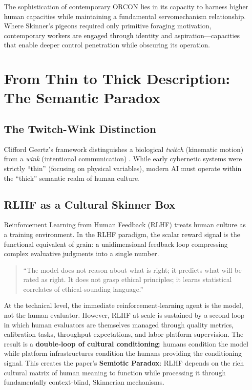 \documentclass[11pt, a4paper]{article}
\begin{document}
The sophistication of contemporary ORCON lies in its capacity to harness higher human capacities while maintaining a fundamental servomechanism relationship. Where Skinner's pigeons required only primitive foraging motivation, contemporary workers are engaged through identity and aspiration—capacities that enable deeper control penetration while obscuring its operation.

\section{From Thin to Thick Description: The Semantic Paradox}

\subsection{The Twitch-Wink Distinction}
Clifford Geertz’s framework distinguishes a biological \textit{twitch} (kinematic motion) from a \textit{wink} (intentional communication) \cite{geertz1973interpretation}. While early cybernetic systems were strictly ``thin'' (focusing on physical variables), modern AI must operate within the ``thick'' semantic realm of human culture.

\subsection{RLHF as a Cultural Skinner Box}
Reinforcement Learning from Human Feedback (RLHF) treats human culture as a training environment. In the RLHF paradigm, the scalar reward signal is the functional equivalent of grain: a unidimensional feedback loop compressing complex evaluative judgments into a single number.
\begin{quote}
``The model does not reason about what is right; it predicts what will be rated as right. It does not grasp ethical principles; it learns statistical correlates of ethical-sounding language.''
\end{quote}
At the technical level, the immediate reinforcement-learning agent is the model, not the human evaluator. However, RLHF at scale is sustained by a second loop in which human evaluators are themselves managed through quality metrics, calibration tasks, throughput expectations, and labor-platform supervision. The result is a \textbf{double-loop of cultural conditioning}: humans condition the model while platform infrastructures condition the humans providing the conditioning signal. This creates the paper's \textbf{Semiotic Paradox}: RLHF depends on the rich cultural matrix of human meaning to function while processing it through fundamentally context-blind, Skinnerian mechanisms.
\end{document}
